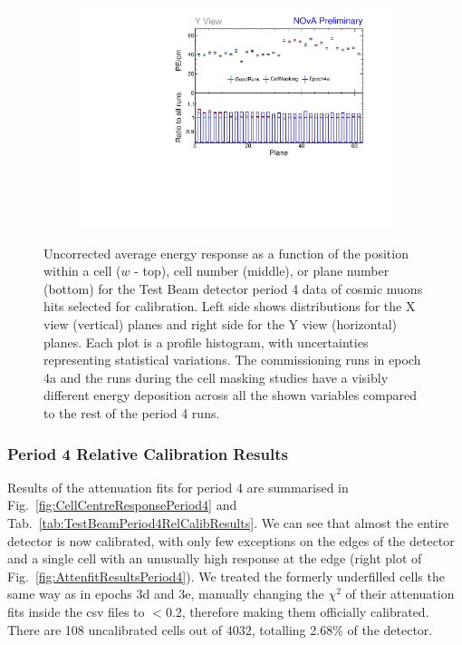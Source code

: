 \begin{figure}[!hbtp]
\begin{subfigure}[b]{0.495\textwidth}
\end{subfigure}
\begin{subfigure}[b]{0.495\textwidth}
\centering
\includegraphics[width=\textwidth]{Plots/TBCalibration/Attenprofs_P4Data_PlanePE_Y_Combined.pdf}
\end{subfigure}
\caption[Uncorrected energy response along $w$, cell and plane for period 4]{Uncorrected average energy response as a function of the position within a cell ($w$ - top), cell number (middle), or plane number (bottom) for the Test Beam detector period 4 data of cosmic muons hits selected for calibration. Left side shows distributions for the X view (vertical) planes and right side for the Y view (horizontal) planes. Each plot is a profile histogram, with uncertainties representing statistical variations. The commissioning runs in epoch 4a and the runs during the cell masking studies have a visibly different energy deposition across all the shown variables compared to the rest of the period 4 runs.}
\label{fig:Calibhist_period4}
\end{figure}

\subsubsection*{Period 4 Relative Calibration Results}

Results of the attenuation fits for period 4 are summarised in Fig.~\ref{fig:CellCentreResponsePeriod4} and Tab.~\ref{tab:TestBeamPeriod4RelCalibResults}. We can see that almost the entire detector is now calibrated, with only few exceptions on the edges of the detector and a single cell with an unusually high response at the edge (right plot of Fig.~\ref{fig:AttenfitResultsPeriod4}). We treated the formerly underfilled cells the same way as in epochs 3d and 3e, manually changing the $\chi^2$ of their attenuation fits inside the csv files to $<0.2$, therefore making them officially calibrated. There are 108 uncalibrated cells out of 4032, totalling 2.68\% of the detector.

